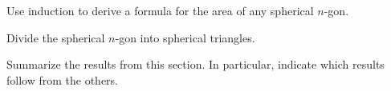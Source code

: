 \documentclass[newpage,hints,handout]{ximera}
\begin{document}
\begin{problem}
Use induction to derive a formula for the area of any spherical
$n$-gon.
\begin{hint}
Divide the spherical $n$-gon into spherical triangles.
\end{hint}
\end{problem}


\begin{problem}
Summarize the results from this section. In particular, indicate which
results follow from the others.
\begin{freeResponse}
\end{freeResponse}
\end{problem}
\end{document}
